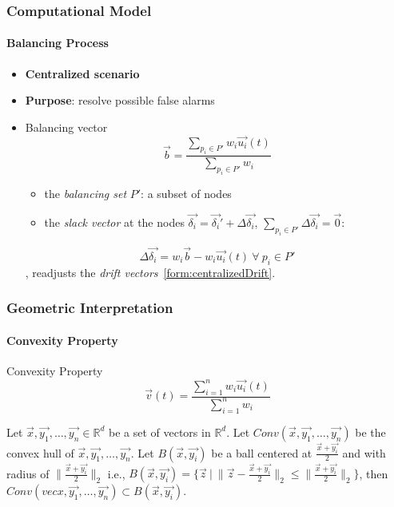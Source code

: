 \documentclass[hyperref={pdfpagelabels=false}]{beamer}
\begin{document}
\begin{frame} \frametitle{Computational Model}\framesubtitle{Balancing Process}
\begin{itemize}
\item[] \textbf{Centralized scenario}
\item[] \textbf{Purpose}: resolve possible false alarms
\item[]
\begin{block}{Balancing vector}
\begin{equation}
\vec{b}=\frac{ \sum_{p_i \in P'} {w_i\vec{u_i}(t)} }{ \sum_{p_i \in P'} {w_i} }
\label{form:balancingVector}
\end{equation}
\end{block}
\begin{itemize}
	\item the \emph{balancing set} $P'$: a subset of nodes
	\item the \emph{slack vector} at the nodes $\vec{\delta_i}=\vec{\delta_i}'+\Delta\vec{\delta_i}$, $\sum_{p_i \in P'} \Delta \vec{\delta_i}= \vec{0}$:
\end{itemize}
\begin{equation}
\Delta\vec{\delta_i}=w_i\vec{b}-w_i\vec{u_i}(t)\ \forall\ p_i \in P'
\end{equation}
, readjusts the \emph{drift vectors}~\eqref{form:centralizedDrift}.
\end{itemize}
\end{frame}

\begin{frame} \frametitle{Geometric Interpretation}\framesubtitle{Convexity Property}
\begin{block}{Convexity Property}
\begin{equation}
\vec{v}(t)=\frac{\sum_{i=1}^n {w_i\vec{u_i}(t)}}{\sum_{i=1}^n {w_i}}
\label{form:convexityProperty}
\end{equation}
\end{block}
\begin{theorem}[Sharfman et al.]\label{theorem:convexHull} %
Let $\vec{x}, \vec{y_1}, \dots, \vec{y_n} \in \mathbb{R}^d$ be a set of vectors in $\mathbb{R}^d$. Let $Conv(\vec{x}, \vec{y_1}, \dots, \vec{y_n})$ be the convex hull of $\vec{x}, \vec{y_1}, \dots, \vec{y_n}$. Let $B(\vec{x}, \vec{y_i})$ be a ball centered at $\frac{\vec{x}+\vec{y_i}}{2}$ and with radius of $\lVert{\frac{\vec{x}+\vec{y_i}}{2}}\rVert_2$ i.e., $B(\vec{x}, \vec{y_i})=\{\vec{z}\ |\ \lVert{\vec{z}-\frac{\vec{x}+\vec{y_i}}{2}}\rVert_2 \leq \lVert{\frac{\vec{x}+\vec{y_i}}{2}}\rVert_2 \}$, then $Conv(vec{x}, \vec{y_1}, \dots, \vec{y_n}) \subset B(\vec{x}, \vec{y_i})$.
\end{theorem}
\end{frame}
\end{document}
